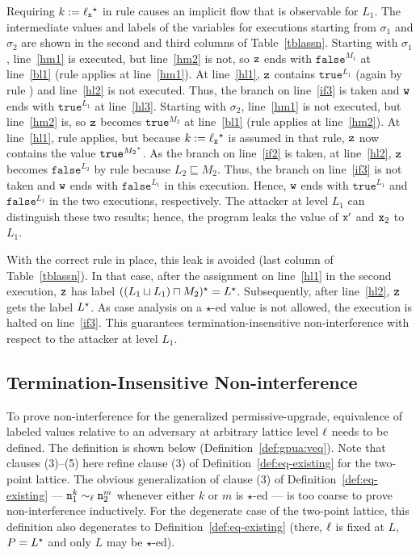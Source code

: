 Requiring $k := \ell_{\texttt{x}}{}^\star$ in rule  causes an
implicit flow that is observable for $L_1$. The intermediate values
and labels of the variables for executions starting from $\sigma_1$
and $\sigma_2$ are shown in the second and third columns of
Table~\ref{tblassn}. Starting with $\sigma_1$, line~\ref{hm1} is
executed, but line~\ref{hm2} is not, so $\texttt{z}$ ends with
$\texttt{false}^{M_1}$ at line~\ref{bl1} (rule  applies at
line~\ref{hm1}). At line~\ref{hl1}, $\texttt{z}$ contains $\texttt{true}^{L_1}$
(again by rule ) and line~\ref{hl2} is not executed. Thus, the
branch on line~\ref{if3} is taken and $\texttt{w}$ ends with
$\texttt{true}^{L_1}$ at line~\ref{hl3}. Starting with $\sigma_2$,
line~\ref{hm1} is not executed, but line~\ref{hm2} is, so $\texttt{z}$ becomes
$\texttt{true}^{M_2}$ at line~\ref{bl1} (rule  applies at
line~\ref{hm2}). At line~\ref{hl1}, rule  applies, but because
$k := \ell_{\texttt{x}}{}^\star$ is assumed in that rule, $\texttt{z}$ now contains the
value $\texttt{true}^{M_2{}^\star}$. As the branch on line~\ref{if2} is
taken, at line~\ref{hl2}, $\texttt{z}$ becomes $\texttt{false}^{L_2}$ by rule
 because $L_2 \sqsubseteq M_2$. Thus, the branch on
line~\ref{if3} is not taken and $\texttt{w}$ ends with $\texttt{false}^{L_1}$
in this execution. Hence, $\texttt{w}$ ends with $\texttt{true}^{L_1}$ and
$\texttt{false}^{L_1}$ in the two executions, respectively. The
attacker at level $L_1$ can distinguish these two results; hence, the
program leaks the value of $\texttt{x}'$ and $\texttt{x}_2$ to $L_1$.

With the correct  rule in place, this leak is avoided (last
column of Table~\ref{tblassn}). In that case, after the assignment on
line~\ref{hl1} in the second execution, $\texttt{z}$ has label $((L_1 \sqcup L_1) \sqcap
M_2){}^\star = L{}^\star$. Subsequently, after line~\ref{hl2}, $\texttt{z}$ gets the
label $L{}^\star$. As case analysis on a $\star$-ed value is not allowed,
the execution is halted on line~\ref{if3}. This guarantees
termination-insensitive non-interference with respect to the attacker
at level $L_1$.

\subsection{Termination-Insensitive Non-interference}

To prove non-interference for the generalized permissive-upgrade,
equivalence of labeled values relative to an adversary at arbitrary
lattice level $\ell$ needs to be defined. The definition is shown
below (Definition~\ref{def:gpua:veq}). Note that clauses (3)--(5) here
refine clause (3) of Definition~\ref{def:eq-existing} for the two-point
lattice. The obvious generalization of clause (3) of
Definition~\ref{def:eq-existing} --- $\texttt{n}_1^k \sim_\ell \texttt{n}_2^m$ whenever 
either $k$ or $m$ is $\star$-ed --- is too coarse to prove
non-interference inductively. For the degenerate case of the two-point
lattice, this definition also degenerates to
Definition~\ref{def:eq-existing} (there, $\ell$ is fixed at $L$, $P = 
L{}^\star$ and only $L$ may be $\star$-ed).

